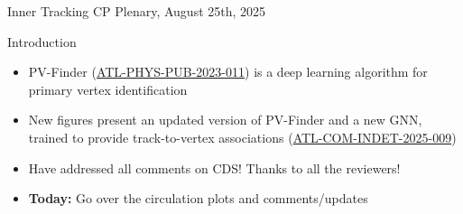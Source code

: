 \documentclass[xcolor=table,aspectratio=169]{beamer}
\begin{document}
\begin{frame}[plain]
    \centering
    Inner Tracking CP Plenary, August 25th, 2025
\end{frame}

\begin{frame}{Introduction}
    \begin{itemize}
        \item PV-Finder (\href{https://cds.cern.ch/record/2858348?ln=en}{ATL-PHYS-PUB-2023-011}) is a deep learning algorithm for primary vertex identification
        \item New figures present an updated version of PV-Finder and a new GNN, trained to provide track-to-vertex associations (\href{https://cds.cern.ch/record/2939446/}{ATL-COM-INDET-2025-009})
        \item Have addressed all comments on CDS! Thanks to all the reviewers!
        \item \textbf{Today:} Go over the circulation plots and comments/updates
    \end{itemize}
\end{frame}


\end{document}

